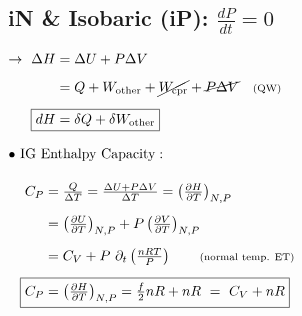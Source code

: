 \documentclass[12pt]{article}
\begin{document}
\vspace{5pt}\noindent
\subsection{iN \& Isobaric (iP): \(\boxed{ \tfrac{dP}{dt} = 0 }\)}
\begin{minipage}[t]{.49\textwidth}
    \(\rightarrow \ \begin{aligned}[t]
        \Delta H &= \Delta U + P \Delta V\\[5pt]
        &= Q + W_\text{other} + \cancel{ W_\text{cpr} } + \cancel{ P \Delta V } 
            \ \ \ \text{\scriptsize(QW)}\\[5pt]
        \Aboxed{ dH &= \delta Q + \delta W_\text{other} }
    \end{aligned}\)    

    \vspace{15pt}
    \(\bullet \ \begin{aligned}[t]
        &\text{IG Enthalpy Capacity}:\\[10pt]
        &\begin{aligned}[t]
            C_P &= \tfrac{Q}{\Delta T} = \tfrac{\Delta U + P \Delta V}{\Delta T} 
                = \left( \tfrac{\partial H}{\partial T} \right)_{N,P}\\[5pt]
            &= \left( \tfrac{\partial U}{\partial T} \right)_{N,P} 
                + P \left( \tfrac{\partial V}{\partial T} \right)_{N,P}\\[5pt]
            &= C_V + P\ \partial_t \left( \tfrac{nRT}{P} \right)
                \hspace{20pt} \text{\scriptsize(normal temp. ET)}\\[5pt]
            \Aboxed{ C_P &= \left( \tfrac{\partial H}{\partial T} \right)_{N,P} 
                = \tfrac{f}{2} nR + nR \ =\ C_V + nR }
        \end{aligned}
    \end{aligned}\) 
\end{minipage}
\end{document}
